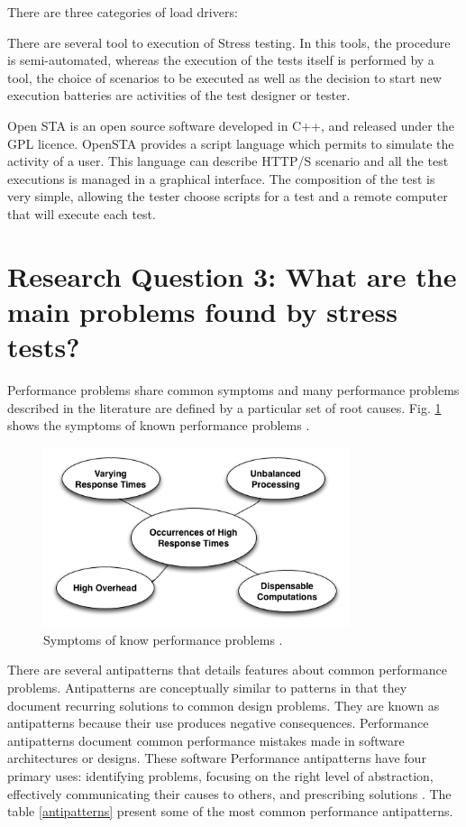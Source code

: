 There are three categories of load drivers: 



There are several tool to execution of Stress testing. In this tools, the procedure is semi-automated, whereas the execution of the tests itself is performed by a tool, the choice of scenarios to be executed as well as the decision to start new execution batteries are activities of the test designer or tester.

Open STA is an open source software developed in C++, and released under the GPL licence. OpenSTA provides a script language which permits to simulate the activity of a user. This language can describe HTTP/S scenario and all the test executions is managed in a graphical interface. The composition of the test is
very simple, allowing the tester choose scripts for a test and a remote computer that will execute each test.

\section{Research Question 3: What are the main problems found by stress tests?}

 Performance problems share common symptoms and many performance problems described in the literature are defined by a particular set of root causes. Fig. \ref{fig:symptoms}  shows the symptoms of known performance problems \cite{Wert2013a}. 



\begin{figure}[h]
\centering
\includegraphics[width=0.8\textwidth]{./images/symptoms.png}
\caption{Symptoms of know performance problems \cite{Wert2013a}. }
\label{fig:symptoms}
\end{figure}


There are several antipatterns that details features about  common performance problems. Antipatterns are conceptually similar to patterns in that they document recurring solutions to common design problems. They are known as
antipatterns because their use produces negative consequences.  Performance antipatterns document common performance mistakes made in software architectures or designs. These software Performance antipatterns have four primary uses: identifying problems,
focusing on the
right level of abstraction,
effectively communicating
their causes to others, and prescribing solutions \cite{brown1998antipatterns}. The table \ref{antipatterns} present some of the most common performance antipatterns.


